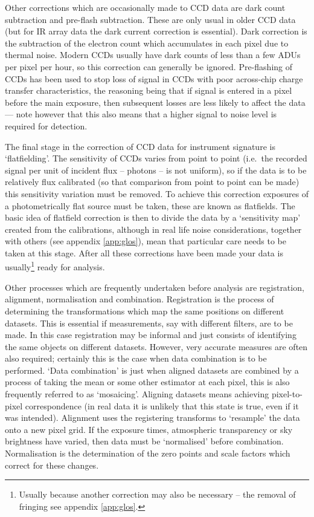 \documentclass[twoside,11pt]{article}
\renewcommand{\_}{\texttt{\symbol{95}}}
\begin{document}
Other corrections which are occasionally made to CCD data are
dark count subtraction and pre-flash subtraction.
These are only usual in older CCD data (but for IR array data the dark
current correction is essential).
Dark correction is the subtraction of the electron count which
accumulates in each pixel due to thermal noise.
Modern CCDs usually have dark counts of less than a few ADUs per pixel
per hour, so this correction can generally be ignored.
Pre-flashing of CCDs has been used to stop loss of signal in CCDs with
poor across-chip charge transfer characteristics, the reasoning being
that if signal is entered in a pixel before the main exposure, then
subsequent losses are less likely to affect the data --- note however
that this also means that a higher signal to noise level is required
for detection.

The final stage in the correction of CCD data for instrument signature
is `flatfielding'.
The sensitivity of CCDs varies from point to point (i.e.\ the recorded
signal per unit of incident flux -- photons -- is not uniform), so if
the data is to be relatively flux calibrated (so that comparison from
point to point can be made) this sensitivity variation must be
removed.
To achieve this correction exposures of a photometrically flat source
must be taken, these are known as flatfields.
The basic idea of flatfield correction is then to divide the data by a
`sensitivity map' created from the calibrations, although in real life
noise considerations, together with others (see appendix \ref{app:glos}),
mean that particular care needs to be taken at this stage.
After all these corrections have been made your data is
usually\footnote{Usually because another correction may also be
necessary -- the removal of fringing see appendix \ref{app:glos}.}
ready for analysis.

Other processes which are frequently undertaken before analysis are
registration, alignment, normalisation and combination. Registration is
the process of determining the transformations which map the same
positions on different datasets. This is essential if measurements, say
with different filters, are to be made. In this case registration may be
informal and just consists of identifying the same objects on different
datasets. However, very accurate measures are often also required;
certainly this is the case when data combination is to be performed.
`Data combination' is just when aligned datasets are combined by a
process of taking the mean or some other estimator at each pixel, this
is also frequently referred to as `mosaicing'. Aligning datasets
means achieving pixel-to-pixel correspondence (in real data it is
unlikely that this state is true, even if it was intended).
Alignment uses the registering transforms to `resample' the data onto
a new pixel grid. If the exposure times, atmospheric transparency or
sky brightness have varied, then data must be `normalised' before
combination. Normalisation is the determination of the zero points and
scale factors which correct for these changes.
\end{document}
